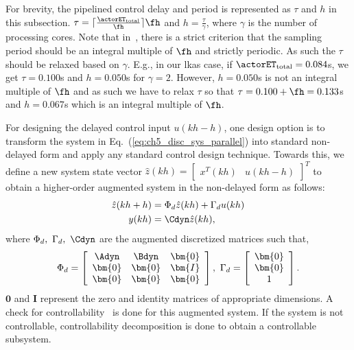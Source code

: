 For brevity, the pipelined control delay and period is represented as $\tau$ and $h$ in this subsection. $\tau=\lceil\frac{\actorET_{\text{total}}}{\fh}\rceil \fh$ and $h=\frac{\tau}{\gamma}$, where $\gamma$ is the number of processing cores. Note that in~\cite{medina2019designing}, there is a strict criterion that the sampling period should be an integral multiple of $\fh$ and strictly periodic. As such the $\tau$ should be relaxed based on $\gamma$. E.g., in our \gls{lkas} case, if $\actorET_{\text{total}}=0.084$s, we get $\tau=0.100$s and $h=0.050$s for $\gamma=2$. However, $h=0.050$s is not an integral multiple of $\fh$ and as such we have to relax $\tau$ so that $\tau=0.100+\fh=0.133$s and $h=0.067$s which is an integral multiple of $\fh$. 

For designing the delayed control input $u(kh-h)$, one
design option is to transform the system in Eq.~(\ref{eq:ch5_disc_sys_parallel}) into standard non-delayed
form and apply any standard control design technique.
Towards this, we define a new system state vector $\hat{z}(kh)=\left[ \begin{array}{cc} x^T(kh) &  u(kh-h) \end{array} \right]^T$ to obtain a higher-order augmented system in the non-delayed form as follows:
\begin{eqnarray}
\label{eq:ch5_aug_pipelined}
\hat{z}(kh+h) &= \Phi_d\hat{z}(kh) + \Gamma_du(kh) \\
y(kh) &= \Cdyn \hat{z}(kh),\nonumber
\end{eqnarray}
where $\Phi_d,\ \Gamma_d,\ \Cdyn$ are the augmented discretized matrices such that,
\begin{eqnarray}
\Phi_d = \left[ \begin{array}{ccc} \Adyn &  \Bdyn & \bm{0} \\  \bm{0} & \bm{0} & \bm{I} \\
\bm{0} & \bm{0} & \bm{0}\end{array} \right],\
\Gamma_{d} = \left[ \begin{array}{c} \bm{0} \\ \bm{0} \\ 1  \end{array} \right].
\nonumber
\end{eqnarray}
$\bm{0}$ and $\bm{I}$ represent the zero and identity matrices of appropriate dimensions. A check for controllability~\cite{dorf2011modern} is done for this augmented system.
If the system is not controllable, controllability decomposition is done to obtain a controllable subsystem.

